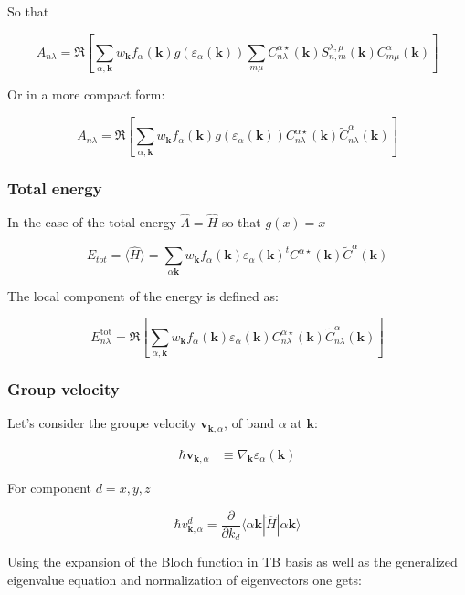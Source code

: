 \documentclass{article}
\newcommand{\bra}[1]{\langle #1|}
\newcommand{\ket}[1]{|#1\rangle}
\newcommand{\op}[1]{\hat{#1}}
\begin{document}
\noindent
So that

\[ A_{n \lambda}=\Re \left[ 
\sum_{\alpha,\mathbf{k}} w_{\mathbf{k}} f_{\alpha}(\mathbf{k})g(\varepsilon_{\alpha}(\mathbf{k})) \sum_{m \mu} C_{n \lambda}^{\alpha \star}(\mathbf{k})
S_{n,m}^{\lambda,\mu}(\mathbf{k})C_{m \mu}^{\alpha}(\mathbf{k}) \right] \]

\noindent
Or in a more compact form:

\[ A_{n \lambda}=\Re \left[ 
\sum_{\alpha,\mathbf{k}} w_{\mathbf{k}} f_{\alpha}(\mathbf{k})g(\varepsilon_{\alpha}(\mathbf{k})) 
C_{n \lambda}^{\alpha \star}(\mathbf{k}) \widetilde{C}_{n \lambda}^{\alpha}(\mathbf{k}) \right]
 \]

\subsubsection{Total energy}

\noindent
In the case of the total energy $\op{A}=\op{H} $ so that $g(x)=x$

\[E_{tot}=\langle \op{H}\rangle=\sum_{\alpha \mathbf{k}} w_{\mathbf{k}}
f_{\alpha}(\mathbf{k})\varepsilon_{\alpha}(\mathbf{k})
^tC^{\alpha \star}(\mathbf{k})\widetilde{C}^{\alpha}(\mathbf{k}) \]

 \noindent
The local component of the energy is defined as:

\[ E_{n \lambda}^{\text{tot}}=\Re \left[ 
\sum_{\alpha,\mathbf{k}} w_{\mathbf{k}} f_{\alpha}(\mathbf{k})\varepsilon_{\alpha}(\mathbf{k})
C_{n \lambda}^{\alpha \star}(\mathbf{k}) \widetilde{C}_{n \lambda}^{\alpha}(\mathbf{k}) \right]
 \]

\subsubsection{Group velocity }

Let's consider the groupe velocity $\mathbf{v}_{\mathbf{k},\alpha}$, of band $\alpha$ at $\mathbf{k}$:

\begin{align*} 
  \hbar \mathbf{v}_{\mathbf{k},\alpha}&\equiv\nabla_{\mathbf{k}} \varepsilon_{\alpha}(\mathbf{k})
\end{align*}

\noindent
For component $d=x,y,z$

\[ \hbar v_{\mathbf{k},\alpha}^{d}=\frac{\partial}{\partial k_{d}} \bra{\alpha \mathbf{k}} \op{H} \ket{\alpha \mathbf{k}}\]

\noindent
Using the expansion of the Bloch function in TB basis as well as the generalized eigenvalue equation and normalization of eigenvectors one gets:
\end{document}
